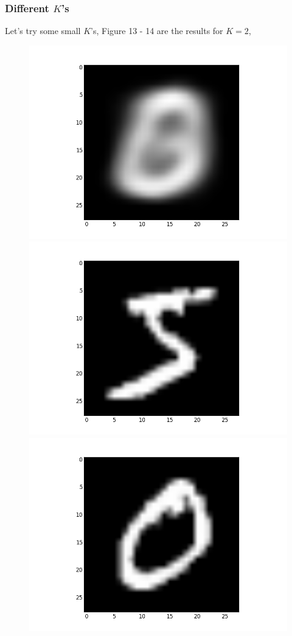 \documentclass[submit]{harvardml}
\begin{document}
\subsubsection*{Different $K$'s}

Let's try some small $K$'s, Figure 13 - 14 are the results for $K=2$,

\begin{figure}[ht]
    \centering
    \includegraphics[scale=0.15]{K2-mean-0}
    \includegraphics[scale=0.15]{K2-representative-0-0}
    \includegraphics[scale=0.15]{K2-representative-0-1}

\end{figure}
\end{document}
